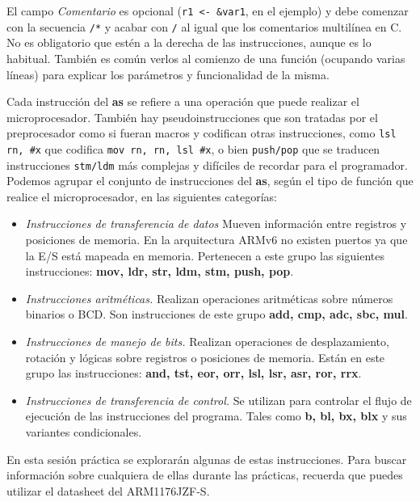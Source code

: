 El campo \textit{Comentario} es opcional ({\tt r1 <- \&var1}, en el ejemplo)
y debe comenzar con la secuencia {\tt /*} y acabar con {\tt */} al igual
que los comentarios multilínea en C. No es obligatorio que estén a la
derecha de las instrucciones, aunque es lo habitual. También es común
verlos al comienzo de una función (ocupando varias líneas) para explicar
los parámetros y funcionalidad de la misma.

Cada instrucción del {\bf as} se refiere a una operación que puede
realizar el microprocesador. También hay pseudoinstrucciones que son
tratadas por el preprocesador como si fueran macros y codifican otras
instrucciones, como {\tt lsl rn, \#x} que codifica {\tt mov rn, rn, lsl \#x},
o bien {\tt push/pop} que se traducen instrucciones {\tt stm/ldm} más complejas
y difíciles de recordar para el programador. Podemos agrupar el conjunto de
instrucciones del {\bf as}, según el tipo de función que realice el
microprocesador, en las siguientes categorías:

\begin{itemize}

       \item \textit{Instrucciones de transferencia de datos}
Mueven información entre registros y posiciones de memoria. En la
arquitectura ARMv6 no existen puertos ya que la E/S está mapeada
en memoria. Pertenecen a este grupo las siguientes instrucciones:
\textbf{mov, ldr, str, ldm, stm, push, pop}.

       \item \textit{Instrucciones aritméticas.}  Realizan operaciones
aritméticas sobre números binarios o BCD.  Son instrucciones de este
grupo \textbf{add, cmp, adc, sbc, mul}.

     \item \textit{Instrucciones de manejo de bits.}  Realizan
operaciones de desplazamiento, rotación y lógicas sobre registros o
posiciones de memoria. Están en este grupo las instrucciones:\textbf{
and, tst, eor, orr, lsl, lsr, asr, ror, rrx}.

     \item \textit{Instrucciones de transferencia de control.}  Se
utilizan para controlar el flujo de ejecución de las instrucciones
del programa. Tales como \textbf{b, bl, bx, blx} y sus variantes
condicionales.

\end{itemize}

En esta sesión práctica se explorarán algunas de estas instrucciones.
Para buscar información sobre cualquiera de ellas durante las prácticas,
recuerda que puedes utilizar el datasheet del ARM1176JZF-S.

